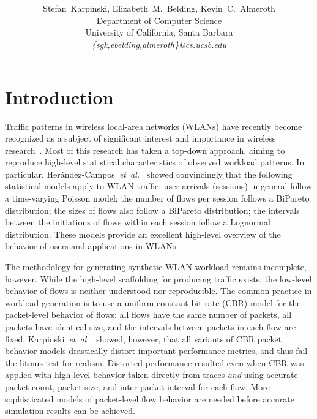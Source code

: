 \documentclass[conference]{IEEEtran}
\title{
\vspace{-0.25em}
\thetitle
}
\author{
{\large{Stefan~Karpinski, Elizabeth~M.~Belding, Kevin~C.~Almeroth}} \vspace{0.25em}\\
Department of Computer Science \\
University of California, Santa Barbara \vspace{0.35em}\\
\textit{\{sgk,ebelding,almeroth\}@cs.ucsb.edu}
}
\newcommand{\caps}[1]{{\small{#1}}}
\begin{document}
\maketitle


\section{Introduction}\label{sec:intro}

Traffic patterns in wireless local-area networks (\caps{WLAN}s) have recently become recognized as a subject of significant interest and importance in wireless research~\cite{Papadopouli05,Hernandez06:wlan-traffic,Ploumidis07,Karaliopoulos07,Karpinski07:realism,Karpinski07:cbr-failure}. Most of this research has taken a top-down approach, aiming to reproduce high-level statistical characteristics of observed workload patterns. In particular, Her\'andez-Campos~\textit{et~al.}~\cite{Hernandez06:wlan-traffic} showed convincingly that the following statistical models apply to \caps{WLAN} traffic: user arrivals (sessions) in general follow a time-varying Poisson model; the number of flows per session follows a BiPareto distribution; the sizes of flows also follow a BiPareto distribution; the intervals between the initiations of flows within each session follow a Lognormal distribution. These models provide an excellent high-level overview of the behavior of users and applications in \caps{WLAN}s.

The methodology for generating synthetic \caps{WLAN} workload remains incomplete, however. While the high-level scaffolding for producing traffic exists, the low-level behavior of flows is neither understood nor reproducible. The common practice in workload generation is to use a uniform constant bit-rate (\caps{CBR}) model for the packet-level behavior of flows: all flows have the same number of packets, all packets have identical size, and the intervals between packets in each flow are fixed. Karpinski~\textit{et~al.}~\cite{Karpinski07:realism,Karpinski07:cbr-failure} showed, however, that all variants of \caps{CBR} packet behavior models drastically distort important performance metrics, and thus fail the litmus test for realism. Distorted performance resulted even when \caps{CBR} was applied with high-level behavior taken directly from traces \textit{and} using accurate packet count, packet size, and inter-packet interval for each flow. More sophisticated models of packet-level flow behavior are needed before accurate simulation results can be achieved.
\end{document}
